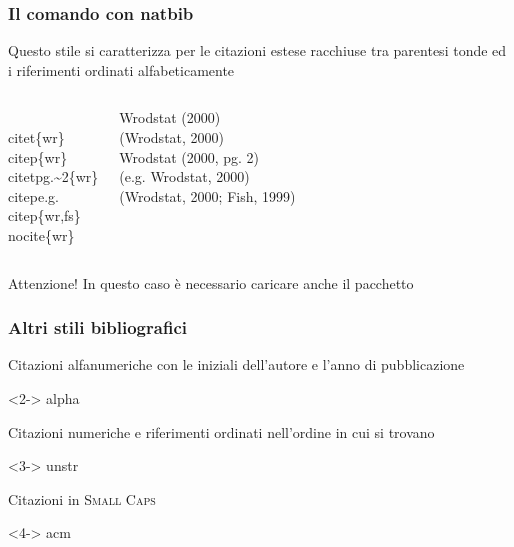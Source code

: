 \documentclass[svgnames,%
	ucs,%
	pdftex]{guitbeamer}
\begin{document}
\begin{frame}
  \frametitle{Il comando  con natbib}
	Questo stile si caratterizza per le citazioni estese racchiuse tra parentesi tonde ed i riferimenti ordinati alfabeticamente %
	\begin{columns}
		\begin{LaTeXcode}
		\\citet\{wr\}\n  
		\\citep\{wr\}\n 
		\\citet\ls pg.\textasciitilde2\rs\{wr\}\n 
		\\citep\ls e.g.\rs\ls\rs\n 
		\\citep\{wr,fs\}\n 
		\\nocite\{wr\}
		\end{LaTeXcode}
	  \column[t]{.55\textwidth}
		\begin{LaTeXoutput} %
		Wrodstat (2000)\\
		(Wrodstat, 2000)\\
		Wrodstat (2000, pg. 2)\\
		(e.g. Wrodstat, 2000)\\
		(Wrodstat, 2000; Fish, 1999)\\
		\ \\
		\end{LaTeXoutput}
	\end{columns}
	\begin{block}{Attenzione!}
	In questo caso \`e necessario caricare anche il pacchetto \Lsty{natbib}
	\end{block}
\end{frame}
\begin{frame}
  \frametitle{Altri stili bibliografici}
	Citazioni alfanumeriche con le iniziali dell'autore e l'anno di pubblicazione
	\begin{LaTeXcode}<2->
		alpha
	\end{LaTeXcode}
	Citazioni numeriche e riferimenti ordinati nell'ordine in cui si trovano
	\begin{LaTeXcode}<3->
		unstr
	\end{LaTeXcode}
	Citazioni in \textsc{Small Caps}
	\begin{LaTeXcode}<4->
		acm
	\end{LaTeXcode}
\end{frame}
\end{document}
